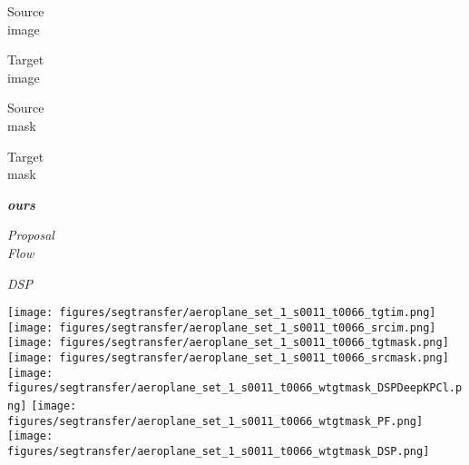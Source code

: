 \documentclass[10pt,twocolumn,letterpaper]{article}
\begin{document}
\begin{figure*}[t]
\scriptsize\newcommand{\segtransferw}{0.12}%
\begin{center}
  \begin{minipage}[c]{\segtransferw\linewidth} \centering
  Source \\ image
  \end{minipage}
  \begin{minipage}[c]{\segtransferw\linewidth} \centering
  Target \\ image
  \end{minipage}
  \begin{minipage}[c]{\segtransferw\linewidth} \centering
  Source \\ mask
  \end{minipage}
  \begin{minipage}[c]{\segtransferw\linewidth} \centering
  Target \\ mask
  \end{minipage}
  \begin{minipage}[c]{\segtransferw\linewidth} \centering
  \textit{\textbf{ours}}
  \end{minipage}
  \begin{minipage}[c]{\segtransferw\linewidth} \centering
  \textit{Proposal \\ Flow}  \cite{ham2016} %
  \end{minipage}
  \begin{minipage}[c]{\segtransferw\linewidth} \centering
  \textit{DSP}  \cite{kim2013deformable} %
  \end{minipage}
  \texttt{[image: figures/segtransfer/aeroplane\_set\_1\_s0011\_t0066\_tgtim.png]}
  \texttt{[image: figures/segtransfer/aeroplane\_set\_1\_s0011\_t0066\_srcim.png]}
  \texttt{[image: figures/segtransfer/aeroplane\_set\_1\_s0011\_t0066\_tgtmask.png]}
  \texttt{[image: figures/segtransfer/aeroplane\_set\_1\_s0011\_t0066\_srcmask.png]}
  \texttt{[image: figures/segtransfer/aeroplane\_set\_1\_s0011\_t0066\_wtgtmask\_DSPDeepKPCl.png]}
  \texttt{[image: figures/segtransfer/aeroplane\_set\_1\_s0011\_t0066\_wtgtmask\_PF.png]}
  \texttt{[image: figures/segtransfer/aeroplane\_set\_1\_s0011\_t0066\_wtgtmask\_DSP.png]}
\\




\end{center}
\end{figure*}
\end{document}
